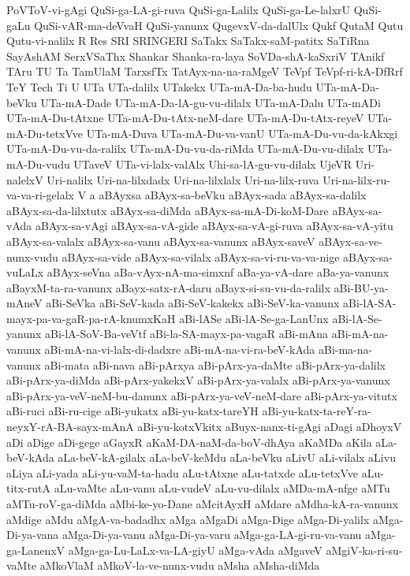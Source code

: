 {PoVToV-vi-gAgi
QuSi-ga-LA-gi-ruva
QuSi-ga-Lalilx
QuSi-ga-Le-lalxrU
QuSi-gaLu
QuSi-vAR-ma-deVvaH
QuSi-yanunx
QugevxV-da-dalUlx
Qukf
QutaM
Qutu
Qutu-vi-nalilx
R
Res
SRI
SRINGERI
SaTakx
SaTakx-saM-patitx
SaTiRna
SayAshAM
SerxVSaThx
Shankar
Shanka-ra-laya
SoVDa-shA-kaSxriV
TAnikf
TAru
TU
Ta
TamUlaM
TarxsfTx
TatAyx-na-na-raMgeV
TeVpf
TeVpf-ri-kA-DfRrf
TeY
Tech
Ti
U
UTa
UTa-dalilx
UTakekx
UTa-mA-Da-ba-hudu
UTa-mA-Da-beVku
UTa-mA-Dade
UTa-mA-Da-lA-gu-vu-dilalx
UTa-mA-Dalu
UTa-mADi
UTa-mA-Du-tAtxne
UTa-mA-Du-tAtx-neM-dare
UTa-mA-Du-tAtx-reyeV
UTa-mA-Du-tetxVve
UTa-mA-Duva
UTa-mA-Du-va-vanU
UTa-mA-Du-vu-da-kAkxgi
UTa-mA-Du-vu-da-ralilx
UTa-mA-Du-vu-da-riMda
UTa-mA-Du-vu-dilalx
UTa-mA-Du-vudu
UTaveV
UTa-vi-lalx-valAlx
Uhi-sa-lA-gu-vu-dilalx
UjeVR
Uri-nalelxV
Uri-nalilx
Uri-na-lilxdadx
Uri-na-lilxlalx
Uri-na-lilx-ruva
Uri-na-lilx-ru-va-va-ri-gelalx
V
a
aBAyxsa
aBAyx-sa-beVku
aBAyx-sada
aBAyx-sa-dalilx
aBAyx-sa-da-lilxtutx
aBAyx-sa-diMda
aBAyx-sa-mA-Di-koM-Dare
aBAyx-sa-vAda
aBAyx-sa-vAgi
aBAyx-sa-vA-gide
aBAyx-sa-vA-gi-ruva
aBAyx-sa-vA-yitu
aBAyx-sa-valalx
aBAyx-sa-vanu
aBAyx-sa-vanunx
aBAyx-saveV
aBAyx-sa-ve-nunx-vudu
aBAyx-sa-vide
aBAyx-sa-vilalx
aBAyx-sa-vi-ru-va-va-nige
aBAyx-sa-vuLaLx
aBAyx-seVna
aBa-vAyx-nA-ma-simxnf
aBa-ya-vA-dare
aBa-ya-vanunx
aBayxM-ta-ra-vanunx
aBayx-satx-rA-daru
aBayx-si-su-vu-da-ralilx
aBi-BU-ya-mAneV
aBi-SeVka
aBi-SeV-kada
aBi-SeV-kakekx
aBi-SeV-ka-vanunx
aBi-lA-SA-mayx-pa-va-gaR-pa-rA-knumxKaH
aBi-lASe
aBi-lA-Se-ga-LanUnx
aBi-lA-Se-yanunx
aBi-lA-SoV-Ba-veVtf
aBi-la-SA-mayx-pa-vagaR
aBi-mAna
aBi-mA-na-vanunx
aBi-mA-na-vi-lalx-di-dadxre
aBi-mA-na-vi-ra-beV-kAda
aBi-ma-na-vanunx
aBi-mata
aBi-nava
aBi-pArxya
aBi-pArx-ya-daMte
aBi-pArx-ya-dalilx
aBi-pArx-ya-diMda
aBi-pArx-yakekxV
aBi-pArx-ya-valalx
aBi-pArx-ya-vanunx
aBi-pArx-ya-veV-neM-bu-danunx
aBi-pArx-ya-veV-neM-dare
aBi-pArx-ya-vitutx
aBi-ruci
aBi-ru-cige
aBi-yukatx
aBi-yu-katx-tareYH
aBi-yu-katx-ta-reY-ra-neyxY-rA-BA-sayx-mAnA
aBi-yu-kotxVkitx
aBuyx-nanx-ti-gAgi
aDagi
aDhoyxV
aDi
aDige
aDi-gege
aGayxR
aKaM-DA-naM-da-boV-dhAya
aKaMDa
aKila
aLa-beV-kAda
aLa-beV-kA-gilalx
aLa-beV-keMdu
aLa-beVku
aLivU
aLi-vilalx
aLivu
aLiya
aLi-yada
aLi-yu-vaM-ta-hadu
aLu-tAtxne
aLu-tatxde
aLu-tetxVve
aLu-titx-rutA
aLu-vaMte
aLu-vanu
aLu-vudeV
aLu-vu-dilalx
aMDa-mA-nfge
aMTu
aMTu-roV-ga-diMda
aMbi-ke-yo-Dane
aMcitAyxH
aMdare
aMdha-kA-ra-vanunx
aMdige
aMdu
aMgA-va-badadhx
aMga
aMgaDi
aMga-Dige
aMga-Di-yalilx
aMga-Di-ya-vana
aMga-Di-ya-vanu
aMga-Di-ya-varu
aMga-ga-LA-gi-ru-va-vanu
aMga-ga-LanenxV
aMga-ga-Lu-LaLx-va-LA-giyU
aMga-vAda
aMgaveV
aMgiV-ka-ri-su-vaMte
aMkoVlaM
aMkoV-la-ve-nunx-vudu
aMsha
aMsha-diMda
}
